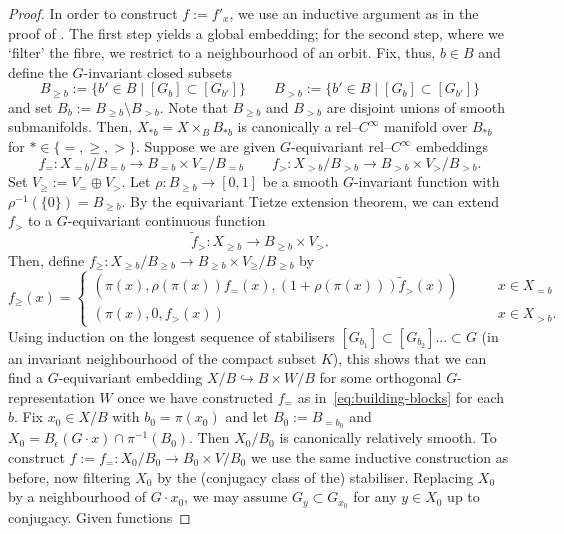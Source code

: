 \documentclass[11pt,psamsfonts, oneside, reqno]{amsart}
\newcommand{\hkra}{\hookrightarrow}
\newcommand{\sub}{\subset}%
\newcommand{\sm}{\ensuremath{\setminus}}%
\newcommand{\inv}{^{-1}}
\newcommand{\cl}{\colon}
\newcommand{\wt}{\widetilde}
\theoremstyle{definition}
\theoremstyle{remark}
\numberwithin{equation}{section}
\begin{document}
\begin{proof}
	In order to construct $f := f'_x$, we use an inductive argument as in the proof of \cite[Theorem~6.1]{Mos57}. The first step yields a global embedding; for the second step, where we `filter' the fibre, we restrict to a neighbourhood of an orbit. Fix, thus, $b \in B$ and define the $G$-invariant closed subsets 
	\[B_{\ge b} := \{b'\in B\mid [G_b] \sub [G_{b'}]\}\qquad B_{> b} := \{b'\in B\mid [G_b] \sub [G_{b'}]\}\]
	and set $B_b := B_{\ge b}\sm B_{> b}$. Note that $B_{\ge b}$ and $B_{> b}$ are disjoint unions of smooth submanifolds. Then, $X_{* b } = X\times_B B_{* b}$ is canonically a rel--$C^\infty$ manifold over $B_{* b}$ for $*\in \{=,\ge ,>\}$. Suppose we are given $G$-equivariant rel--$C^\infty$ embeddings 
	\begin{equation}\label{eq:building-blocks} 
		f_= \cl X_{ = b}/B_{= b} \to B_{= b}\times V_=/B_{= b}  \qquad f_{>} \cl X_{ > b}/B_{> b} \to B_{> b}\times V_>/B_{> b}.
	\end{equation}
	Set $V_{\ge} := V_= \oplus V_{>}$. Let $\rho\cl B_{\ge b}\to [0,1]$ be a smooth $G$-invariant function with $\rho\inv(\{0\}) = B_{\ge b}$. By the equivariant Tietze extension theorem, we can extend $f_>$ to a $G$-equivariant continuous function 
	\[\wt f_{>} \cl X_{\ge b}\to B_{\ge b}\times V_{>}.\] 
	Then, define $f_{\ge}\cl X_{\ge b}/B_{\ge b} \to B_{\ge b}\times V_\ge/B_{\ge b}$ by 
	\begin{equation}\label{eq:patching} 
		f_{\ge}(x) = \begin{cases}
			(\pi(x),\rho(\pi(x))f_{=}(x),(1+\rho(\pi(x)))\wt f_{>}(x))\qquad & x\in X_{=b}\\
			(\pi(x),0,f_{>}(x))\quad & x \in X_{> b}.
		\end{cases}
	\end{equation}
	Using induction on the longest sequence of stabilisers $[G_{b_1}]\sub [G_{b_2}]\dots \sub G$ (in an invariant neighbourhood of the compact subset $K$), this shows that we can find a $G$-equivariant embedding $X/B\hkra B\times W/B$ for some orthogonal $G$-representation $W$ once we have constructed $f_=$ as in~\eqref{eq:building-blocks} for each $b$. Fix $x_0 \in X/B$ with $b_0  =\pi(x_0)$ and let $B_0 := B_{= b_0}$ and $X_0 = B_\epsilon(G\cdot x)\cap \pi\inv(B_0)$. Then $X_0/B_0$ is canonically relatively smooth. To construct $f := f_=\cl X_0/B_0 \to B_0 \times V/B_0$ we use the same inductive construction as before, now filtering $X_0$ by the (conjugacy class of the) stabiliser. Replacing $X_0$ by a neighbourhood of $G\cdot x_0$, we may assume $G_y \sub G_{x_0}$ for any $y \in X_0$ up to conjugacy. Given functions

\end{proof}
\end{document}
